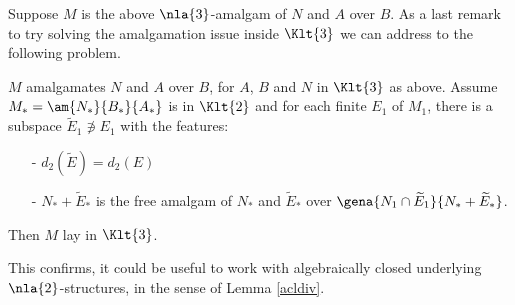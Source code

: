 \medskip
Suppose $M$ is the above $\nla{3}$-amalgam of $N$
and $A$ over $B$.
As a last remark to try solving the amalgamation issue inside $\Klt{3}$ we can address to the following problem.
\begin{rem*}
$M$ amalgamates $N$ and $A$ over $B$, for $A$, $B$ and $N$ in $\Klt{3}$ as above.
Assume $M_{*}=\am{N_{*}}{B_{*}}{A_{*}}$ is in $\Klt{2}$ and for each finite $E_{1}$ of $M_{1}$,
there is a subspace $\widetilde E_{1}\nni E_{1}$ with the features:
\begin{itemize}
\item[-]$d_{2}(\widetilde E)=d_{2}(E)$
\item[-]$N_{*}+\widetilde{E}_{*}$ is the free amalgam of $N_{*}$ and $\widetilde{E}_{*}$ over
$\gena{N_{1}\cap\widetilde{E}_{1}}{N_{*}+\widetilde{E}_{*}}$.
\end{itemize}
Then $M$ lay in $\Klt{3}$.
\end{rem*}
This confirms, it could be useful to work with algebraically closed underlying $\nla{2}$-structures, in the sense of Lemma \ref{acldiv}.